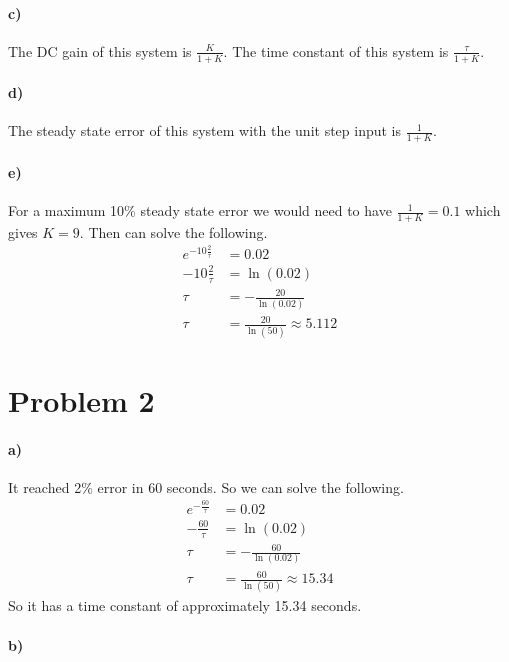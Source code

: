 \documentclass[12pt]{article}
\begin{document}
\paragraph{c)}

The DC gain of this system is \(\frac{K}{1+K}\). The time constant of this system is \(\frac{\tau}{1+K}\).

\paragraph{d)}

The steady state error of this system with the unit step input is \(\frac{1}{1+K}\).

\paragraph{e)}

For a maximum 10\% steady state error we would need to have \(\frac{1}{1+K}=0.1\) which gives \(K=9\). Then can solve the following.
\begin{align*}
    e^{-10\frac{2}{\tau}}&=0.02\\
    -10\frac{2}{\tau}&=\ln(0.02)\\
    \tau &= -\frac{20}{\ln(0.02)}\\
    \tau &=\frac{20}{\ln(50)}\approx 5.112
\end{align*}

\section*{Problem 2}

\paragraph{a)}

It reached 2\% error in 60 seconds. So we can solve the following.
\begin{align*}
    e^{-\frac{60}{\tau}}&=0.02\\
    -\frac{60}{\tau}&=\ln(0.02)\\
    \tau &= -\frac{60}{\ln(0.02)}\\
    \tau &=\frac{60}{\ln(50)}\approx 15.34
\end{align*}
So it has a time constant of approximately 15.34 seconds.

\paragraph{b)}
\end{document}
